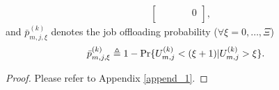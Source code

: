 \begin{lemma}
\begin{itemize}
\begin{align}
\begin{bmatrix}
                  &                       &                       &        & 0                         \\
            \end{bmatrix},
        \end{align}
        and $\bar{p}^{(k)}_{m,j,\xi}$ denotes the job offloading probability ($\forall \xi=0,\dots,\Xi$)
        \begin{align}
            \bar{p}^{(k)}_{m,j,\xi} &\triangleq 1 - \Pr\{U^{(k)}_{m,j} < (\xi+1) | U^{(k)}_{m,j}>\xi\}.
        \end{align}
    \end{itemize}
\end{lemma}
\begin{proof}
    Please refer to Appendix \ref{append_1}.
\end{proof}

